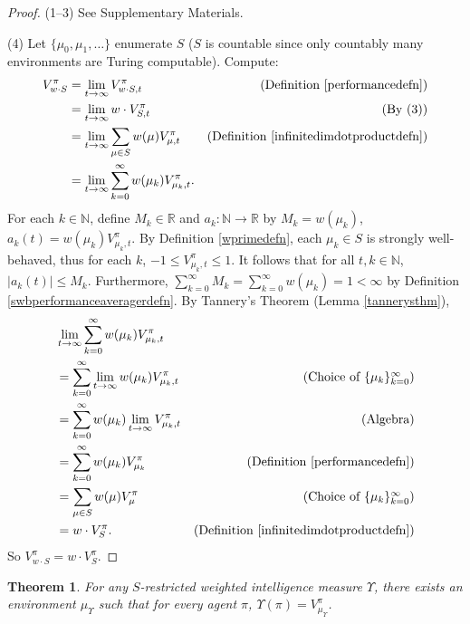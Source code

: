\documentclass[twoside]{article}
\newtheorem{theorem}{Theorem}
\begin{document}
\begin{proof}
    (1--3) See Supplementary Materials.

    (4) Let $\{\mu_0,\mu_1,\ldots\}$ enumerate $S$ ($S$ is countable since
    only countably many environments are Turing computable). Compute:
    \begin{align*}
        V^\pi_{w\cdot S}
            &= \lim_{t\to\infty} V^\pi_{w\cdot S,t}
                &\mbox{(Definition \ref{performancedefn})}\\
            &= \lim_{t\to\infty} w\cdot V^\pi_{S,t}
                &\mbox{(By (3))}\\
            &= \lim_{t\to\infty} \sum_{\mu\in S}w(\mu)V^\pi_{\mu,t}
                &\mbox{(Definition \ref{infinitedimdotproductdefn})}\\
            &= \lim_{t\to\infty} \sum_{k=0}^\infty w(\mu_k)V^\pi_{\mu_k,t}.
    \end{align*}
    For each $k\in\mathbb N$, define $M_k\in\mathbb R$ and $a_k:\mathbb N\to\mathbb R$
    by $M_k=w(\mu_k)$, $a_k(t)=w(\mu_k)V^\pi_{\mu_k,t}$.
    By Definition \ref{wprimedefn}, each $\mu_k\in S$ is strongly well-behaved,
    thus for each $k$, $-1\leq V^\pi_{\mu_k,t}\leq 1$.
    It follows that for all $t,k\in\mathbb N$, $|a_k(t)|\leq M_k$.
    Furthermore, $\sum_{k=0}^\infty M_k=\sum_{k=0}^\infty w(\mu_k)=1<\infty$
    by Definition \ref{swbperformanceaveragerdefn}.
    By Tannery's Theorem (Lemma \ref{tannerysthm}),
    \begin{align*}
        &{} \lim_{t\to\infty} \sum_{k=0}^\infty w(\mu_k)V^\pi_{\mu_k,t}\\
            &= \sum_{k=0}^\infty\lim_{t\to\infty} w(\mu_k)V^\pi_{\mu_k,t}
                &\mbox{(Choice of $\{\mu_k\}_{k=0}^\infty$)}\\
            &= \sum_{k=0}^\infty w(\mu_k)\lim_{t\to\infty} V^\pi_{\mu_k,t}
                &\mbox{(Algebra)}\\
            &= \sum_{k=0}^\infty w(\mu_k)V^\pi_{\mu_k}
                &\mbox{(Definition \ref{performancedefn})}\\
            &= \sum_{\mu\in S} w(\mu)V^\pi_{\mu}
                &\mbox{(Choice of $\{\mu_k\}_{k=0}^\infty$)}\\
            &= w\cdot V^\pi_{S}.
                &\mbox{(Definition \ref{infinitedimdotproductdefn})}
    \end{align*}
    So $V^\pi_{w\cdot S}=w\cdot V^\pi_{S}$.
\end{proof}

\begin{theorem}
    For any $S$-restricted weighted intelligence measure $\Upsilon$,
    there exists an environment $\mu_\Upsilon$ such that for every agent $\pi$,
    $\Upsilon(\pi)=V^\pi_{\mu_\Upsilon}$.
\end{theorem}
\end{document}
